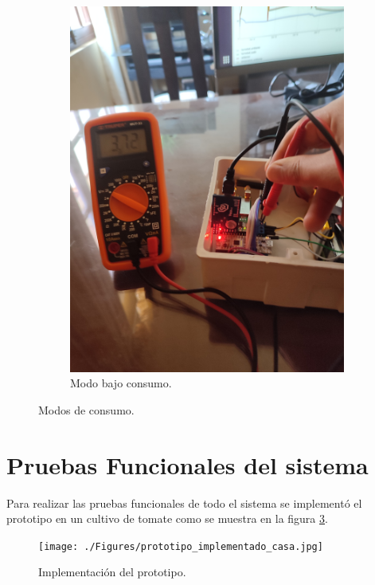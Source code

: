 \begin{figure}[h!]
\begin{subfigure}[b]{0.28\linewidth}
  \includegraphics[width=\linewidth]{./Figures/voltaje3v.jpg}
  \caption{Modo bajo consumo.}
  \label{fig:Bajo consumo}
  \end{subfigure}
  \caption{Modos de consumo.}
  \label{fig:Medicion consumo de corriente}
\end{figure}


\clearpage 
\section{Pruebas Funcionales del sistema}
Para realizar las pruebas funcionales de todo el sistema se implementó el prototipo en un cultivo de tomate como se muestra en la figura \ref{fig:implementacion del prototipo}.

\begin{figure}[h!]
  \centering
    \texttt{[image: ./Figures/prototipo\_implementado\_casa.jpg]}
  \caption{Implementación del prototipo.}
    \label{fig:implementacion del prototipo}
\end{figure}

